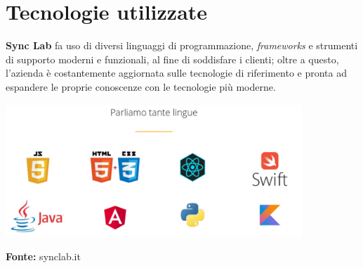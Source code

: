 
\section{Tecnologie utilizzate}

\textbf{Sync Lab} fa uso di diversi linguaggi di programmazione, \textit{frameworks} e strumenti di supporto moderni e funzionali, al fine di soddisfare i clienti; oltre a questo, l'azienda è costantemente aggiornata sulle tecnologie di riferimento e pronta ad espandere le proprie conoscenze con le tecnologie più moderne.

\begin{minipage}{\linewidth}
  \centering
    \includegraphics[height=5cm]{immagini/linguaggi}
  \caption*{\textbf{Fonte:} synclab.it}
\end{minipage}

